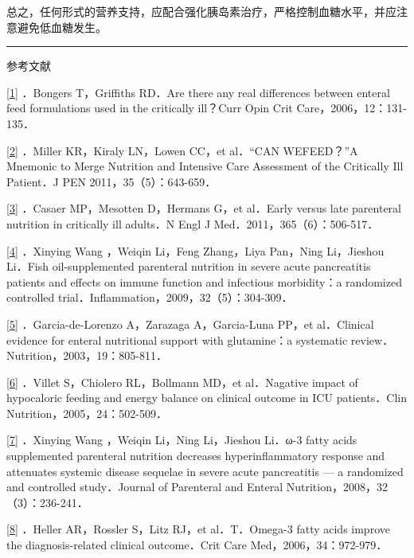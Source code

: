 总之，任何形式的营养支持，应配合强化胰岛素治疗，严格控制血糖水平，并应注意避免低血糖发生。

\begin{center}\rule{0.5\linewidth}{\linethickness}\end{center}

参考文献

\protect\hyperlink{text00028.htmlux5cux23ch1-27-back}{{[}1{]}} ．Bongers
T，Griffiths RD．Are there any real differences between enteral feed
formulations used in the critically ill？Curr Opin Crit
Care，2006，12：131-135．

\protect\hyperlink{text00028.htmlux5cux23ch2-27-back}{{[}2{]}} ．Miller
KR，Kiraly LN，Lowen CC，et al．“CAN WEFEED？”A Mnemonic to Merge
Nutrition and Intensive Care Assessment of the Critically Ill Patient．J
PEN 2011，35（5）：643-659．

\protect\hyperlink{text00028.htmlux5cux23ch3-27-back}{{[}3{]}} ．Casaer
MP，Mesotten D，Hermans G，et al．Early versus late parenteral nutrition
in critically ill adults．N Engl J Med．2011，365（6）：506-517．

\protect\hyperlink{text00028.htmlux5cux23ch4-27-back}{{[}4{]}}
．{Xinying Wang} ，Weiqin Li，Feng Zhang，Liya Pan，Ning Li，Jieshou
Li．Fish oil-supplemented parenteral nutrition in severe acute
pancreatitis patients and effects on immune function and infectious
morbidity：a randomized controlled
trial．Inflammation，2009，32（5）：304-309．

\protect\hyperlink{text00028.htmlux5cux23ch5-27-back}{{[}5{]}}
．Garcia-de-Lorenzo A，Zarazaga A，Garcia-Luna PP，et al．Clinical
evidence for enteral nutritional support with glutamine：a systematic
review．Nutrition，2003，19：805-811．

\protect\hyperlink{text00028.htmlux5cux23ch6-27-back}{{[}6{]}} ．Villet
S，Chiolero RL，Bollmann MD，et al．Nagative impact of hypocaloric
feeding and energy balance on clinical outcome in ICU patients．Clin
Nutrition，2005，24：502-509．

\protect\hyperlink{text00028.htmlux5cux23ch7-27-back}{{[}7{]}}
．{Xinying Wang} ，Weiqin Li，Ning Li，Jieshou Li．ω-3 fatty acids
supplemented parenteral nutrition decreases hyperinflammatory response
and attenuates systemic disease sequelae in severe acute pancreatitis
--- a randomized and controlled study．Journal of Parenteral and Enteral
Nutrition，2008，32（3）：236-241．

\protect\hyperlink{text00028.htmlux5cux23ch8-27-back}{{[}8{]}} ．Heller
AR，Rossler S，Litz RJ，et al．T．Omega-3 fatty acids improve the
diagnosis-related clinical outcome．Crit Care Med，2006，34：972-979．


